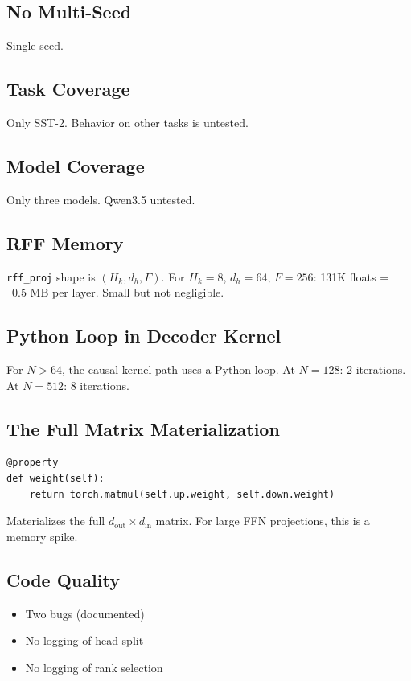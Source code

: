 \subsection{No Multi-Seed}

Single seed.

\subsection{Task Coverage}

Only SST-2. Behavior on other tasks is untested.

\subsection{Model Coverage}

Only three models. Qwen3.5 untested.

\subsection{RFF Memory}

\texttt{rff\_proj} shape is $(H_k, d_h, F)$. For $H_k = 8$, $d_h = 64$, $F = 256$: 
131K floats = ~0.5 MB per layer. Small but not negligible.

\subsection{Python Loop in Decoder Kernel}

For $N > 64$, the causal kernel path uses a Python loop. At $N = 128$: 2 
iterations. At $N = 512$: 8 iterations.

\subsection{The Full Matrix Materialization}

\begin{lstlisting}
@property
def weight(self):
    return torch.matmul(self.up.weight, self.down.weight)
\end{lstlisting}

Materializes the full $d_\text{out} \times d_\text{in}$ matrix. For large 
FFN projections, this is a memory spike.

\subsection{Code Quality}

\begin{itemize}
\item Two bugs (documented)
\item No logging of head split
\item No logging of rank selection

\end{itemize}
